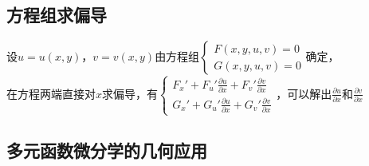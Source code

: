 \documentclass{article}
\begin{document}
\begin{flushleft}
	\subsection{方程组求偏导}
	
	设$u=u(x,y)$，$v=v(x,y)$由方程组$\left\{
	\begin{array}{lcl}
	F(x,y,u,v)=0\\
	G(x,y,u,v)=0
	\end{array} \right.$确定，\\
	在方程两端直接对$x$求偏导，有$\left\{
	\begin{array}{lcl}
	F_x'+F_u'\frac{\partial u}{\partial x}+F_v'\frac{\partial v}{\partial x}\\
	G_x'+G_u'\frac{\partial u}{\partial x}+G_v'\frac{\partial v}{\partial x}
	\end{array} \right.$，可以解出$\frac{\partial u}{\partial x}$和$\frac{\partial v}{\partial x}$\\
	
	\subsection{多元函数微分学的几何应用}
	
	
	
	
\end{flushleft}
\end{document}
